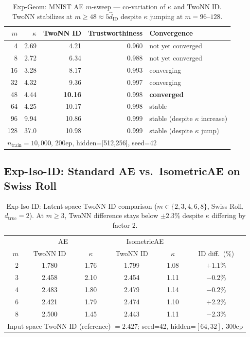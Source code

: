 \documentclass[make,article,submit,pdftex,moreauthors]{Definitions/mdpi}
\newcommand{\kap}{\kappa}
\begin{document}
\begin{table}[H]
\centering
\caption{Exp-Geom: MNIST AE $m$-sweep --- co-variation of $\kap$ and TwoNN ID. TwoNN stabilizes at $m \geq 48 \approx 5\hat{d}_\mathrm{ID}$ despite $\kap$ jumping at $m=96$--$128$.}
\label{tab:eq_mnist}
\small
\begin{tabular}{rrrrl}
\toprule
$m$ & $\kap$ & TwoNN ID & Trustworthiness & Convergence \\
\midrule
 4  & 2.69 & 4.21 & 0.960 & not yet converged \\
 8  & 2.72 & 6.34 & 0.988 & not yet converged \\
16  & 3.28 & 8.17 & 0.993 & converging \\
32  & 4.32 & 9.36 & 0.997 & converging \\
48  & 4.44 & \textbf{10.16} & 0.998 & \textbf{converged} \\
64  & 4.25 & 10.17 & 0.998 & stable \\
96  & 9.94 & 10.86 & 0.999 & stable (despite $\kap$ increase) \\
128 & 37.0 & 10.98 & 0.999 & stable (despite $\kap$ jump) \\
\midrule
\multicolumn{5}{l}{$n_\mathrm{train}=10{,}000$, 200ep, hidden=[512,256], seed=42} \\
\bottomrule
\end{tabular}
\end{table}

\subsection*{Exp-Iso-ID: Standard AE vs.\ IsometricAE on Swiss Roll}

\begin{table}[H]
\centering
\caption{Exp-Iso-ID: Latent-space TwoNN ID comparison ($m \in \{2,3,4,6,8\}$, Swiss Roll, $d_\mathrm{true}=2$). At $m \geq 3$, TwoNN difference stays below $\pm2.3\%$ despite $\kap$ differing by factor 2.}
\label{tab:iso_id}
\small
\begin{tabular}{r cc | cc | c}
\toprule
 & \multicolumn{2}{c|}{AE} & \multicolumn{2}{c|}{IsometricAE} & \\
$m$ & TwoNN ID & $\kap$ & TwoNN ID & $\kap$ & ID diff.\ (\%) \\
\midrule
2 & 1.780 & 1.76 & 1.799 & 1.08 & $+1.1\%$ \\
3 & 2.458 & 2.10 & 2.454 & 1.11 & $-0.2\%$ \\
4 & 2.483 & 1.80 & 2.479 & 1.14 & $-0.2\%$ \\
6 & 2.421 & 1.79 & 2.474 & 1.10 & $+2.2\%$ \\
8 & 2.500 & 1.45 & 2.443 & 1.11 & $-2.3\%$ \\
\midrule
\multicolumn{6}{l}{Input-space TwoNN ID (reference) $= 2.427$; seed=42, hidden=$[64,32]$, 300ep} \\
\bottomrule
\end{tabular}
\end{table}
\end{document}
